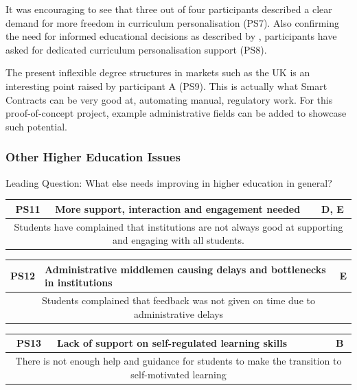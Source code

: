 It was encouraging to see that three out of four participants described a clear demand 
for more freedom in curriculum personalisation (PS7). Also confirming the need for 
informed educational decisions as described by \citet{green2005futurelab}, participants 
have asked for dedicated curriculum personalisation support (PS8).

The present inflexible degree structures in markets such as the UK is an interesting 
point raised by participant A (PS9). This is actually what Smart Contracts 
can be very good at, automating manual, regulatory work. For this proof-of-concept 
project, example administrative fields can be added to showcase such potential.

\subsubsection{Other Higher Education Issues}

Leading Question: What else needs improving in higher education in general?

\begin{table}[!ht]
	\begin{tabularx}{\textwidth}{|c|X|c|}
		\hline
		PS11 & \textbf{More support, interaction and engagement needed} & D, E       \\
		\hline
		\multicolumn{3}{|X|}{Students have complained that institutions are not always 
		good at supporting and engaging with all students.} \\
		\hline
	\end{tabularx}
\end{table}
\begin{table}[!ht]
	\begin{tabularx}{\textwidth}{|c|X|c|}
		\hline
		PS12 & \textbf{Administrative middlemen causing delays and bottlenecks in institutions} & E                \\
		\hline
		\multicolumn{3}{|X|}{Students complained that feedback was not given on time due to administrative delays} \\
		\hline
	\end{tabularx}
\end{table}
\begin{table}[!ht]
	\begin{tabularx}{\textwidth}{|c|X|c|}
		\hline
		PS13 & \textbf{Lack of support on self-regulated learning skills} & B                                                      \\
		\hline
		\multicolumn{3}{|X|}{There is not enough help and guidance for students to make the transition to self-motivated learning} \\
		\hline
	\end{tabularx}
\end{table}

